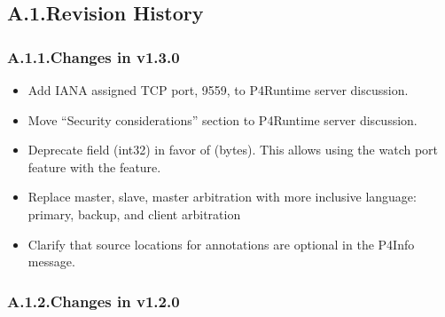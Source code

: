 \documentclass[11pt]{article}
\begin{document}
{%
\subsection{A.1.\hspace*{0.5em}Revision History}\label{sec-revision-history}%

\subsubsection{A.1.1.\hspace*{0.5em}Changes in v1.3.0}\label{sec-changes-in-v130}%

\begin{itemize}[noitemsep,topsep=\mdcompacttopsep]%

\item{}Add IANA assigned TCP port, 9559, to P4Runtime server discussion.%

\item{}Move \textquotedblleft{}Security considerations\textquotedblright{} section to P4Runtime server discussion.%

\item{}Deprecate  field (int32) in favor of  (bytes). This allows
using the watch port feature with the  feature.%

\item{}Replace master, slave, master arbitration with more inclusive language:
primary, backup, and client arbitration%

\item{}Clarify that source locations for annotations are optional in the P4Info
message.%
\end{itemize}%

\subsubsection{A.1.2.\hspace*{0.5em}Changes in v1.2.0}\label{sec-changes-in-v120}%

}
\end{document}
